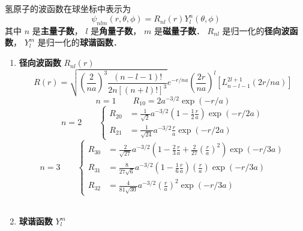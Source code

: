 氢原子的波函数在球坐标中表示为
\begin{equation}
  {\psi _{nlm}}\left( {r,\theta ,\phi } \right) = {R_{nl}}\left( r \right)Y_l^n\left( {\theta ,\phi } \right)
\end{equation}
其中 $n$ 是\textbf{主量子数}， $l$ 是\textbf{角量子数}， $m$ 是\textbf{磁量子数}． ${R_{nl}}$ 是归一化的\textbf{径向波函数}， $Y_l^m$ 是归一化的\textbf{球谐函数}．
\begin{enumerate}
  \item \textbf{径向波函数} ${R_{nl}}(r)$ 
  \begin{equation}
    R\left( r \right) = \sqrt {{{\left( {\frac{2}{{na}}} \right)}^3}\frac{{\left( {n - l - 1} \right)!}}{{2n{{\left[ {\left( {n + l} \right)!} \right]}^3}}}} {e^{ - r/na}}{\left( {\frac{{2r}}{{na}}} \right)^l}\left[ {L_{n - l - 1}^{2l + 1}\left( {2r/na} \right)} \right]
  \end{equation}
  \begin{equation}
    n = 1 
    \qquad
    {R_{10}} = 2{a^{ - 3/2}}\exp \left( { - r/a} \right)
  \end{equation}
  \begin{equation}
    n = 2
    \qquad
    \left\{ \begin{aligned}
{R_{20}} &= \frac{1}{{\sqrt 2 }}{a^{ - 3/2}}\left( {1 - \frac{1}{2}\frac{r}{a}} \right)\exp \left( { - r/2a} \right)\\
{R_{21}} &= \frac{1}{{\sqrt {24} }}{a^{ - 3/2}}\frac{r}{a}\exp \left( { - r/2a} \right)
\end{aligned} \right.
  \end{equation}
  \begin{equation}
    n = 3
    \qquad
    \left\{ \begin{aligned}
{R_{30}} &= \frac{2}{{\sqrt {27} }}{a^{ - 3/2}}\left( {1 - \frac{2}{3}\frac{r}{a} + \frac{2}{{27}}{{\left( {\frac{r}{a}} \right)}^2}} \right)\exp \left( { - r/3a} \right)\\
{R_{31}} &= \frac{8}{{27\sqrt 6 }}{a^{ - 3/2}}\left( {1 - \frac{1}{6}\frac{r}{a}} \right)\left( {\frac{r}{a}} \right)\exp \left( { - r/3a} \right)\\
{R_{32}} &= \frac{4}{{81\sqrt {30} }}{a^{ - 3/2}}{\left( {\frac{r}{a}} \right)^2}\exp \left( { - r/3a} \right)
\end{aligned} \right.
  \end{equation}\\
  \item \textbf{球谐函数} $Y_l^m$ 

\end{enumerate}
